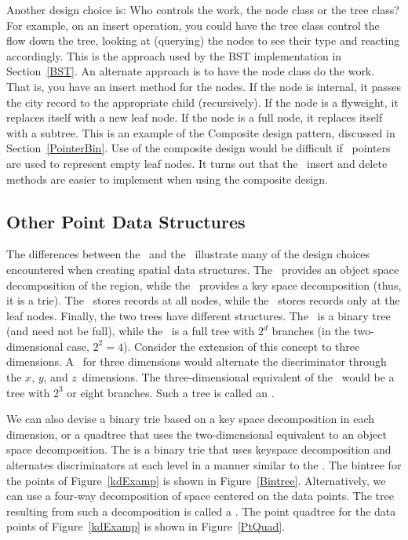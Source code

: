 Another design choice is: Who controls the work, the node
class or the tree class?
For example, on an insert operation, you could have the tree class
control the flow down the tree, looking at (querying) the nodes to see
their type and reacting accordingly.
This is the approach used by the BST implementation in
Section~\ref{BST}.
An alternate approach is to have the node class do the work.
That is, you have an insert method for the nodes.
If the node is internal, it passes the city record to the appropriate
child (recursively).
If the node is a flyweight, it replaces itself with a new leaf node.
If the node is a full node, it replaces itself with a subtree.
This is an example of the Composite design pattern, discussed in
Section~\ref{PointerBin}.
Use of the composite design would be difficult if \NULL\ pointers are
used to represent empty leaf nodes.
It turns out that the \PRquad\ insert and delete methods are easier to
implement when using the composite design.


\subsection{Other Point Data Structures}
\label{OtherSpat}

The differences between the \KDtree\ and
the \PRquad\ illustrate many
of the design choices encountered when creating spatial data
structures.
The \KDtree\ provides an object space decomposition of the
region, while the \PRquad\ provides a key space decomposition
(thus, it is a trie).
The \KDtree\ stores records at all nodes, while the
\PRquad\ stores records only at the leaf nodes.
Finally, the two trees have different structures.
The \KDtree\ is a binary tree (and need not be full),
while the \PRquad\ is a full tree with
$2^d$ branches (in the two-dimensional case, $2^2 = 4$).
Consider the extension of this concept to three dimensions.
A \KDtree\ for three dimensions would alternate the discriminator
through the $x$, $y$, and $z$~dimensions.
The three-dimensional equivalent of the \PRquad\ would be a tree with
$2^3$ or eight branches.
Such a tree is called an .

We can also devise a binary trie based on a key space decomposition in
each dimension, or a quadtree that uses the two-dimensional equivalent
to an object space decomposition.
The  is a binary trie that
uses keyspace decomposition and alternates discriminators at each
level in a manner similar to the \KDtree.
The bintree for the points of Figure~\ref{kdExamp} is shown in
Figure~\ref{Bintree}.
Alternatively, we can use a four-way decomposition of space centered
on the data points.
The tree resulting from such a decomposition is called a
.
The point quadtree for the data points of Figure~\ref{kdExamp} is
shown in Figure~\ref{PtQuad}.

